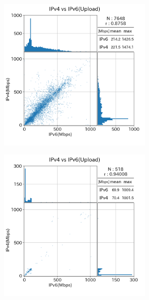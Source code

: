 \begin{figure}[htbp]
    \begin{center}
        \begin{minipage}[t]{0.48\textwidth}
            \begin{center}
                \begin{subfigure}[b]{\textwidth}
                    \centering
                    \includegraphics[width=0.85\textwidth]{fig/old_FTTH_ul.png}
                    \label{old_FTTH_ul}
                \end{subfigure}
                \begin{subfigure}[b]{\textwidth}
                    \centering
                    \includegraphics[width=0.85\textwidth]{fig/old_CATV_ul.png}

\end{subfigure}
\end{center}
\end{minipage}
\end{center}
\end{figure}
